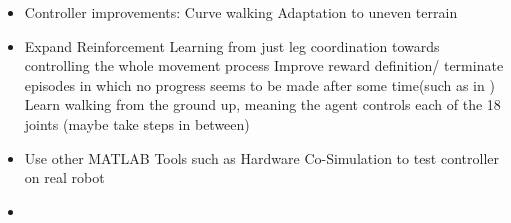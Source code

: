 \begin{itemize}
	
	\item Controller improvements:
		\subitem Curve walking
		\subitem Adaptation to uneven terrain
		\subitem 
	
	\item Expand Reinforcement Learning from just leg coordination towards controlling the whole movement process
		\subitem Improve reward definition/ terminate episodes in which no progress seems to be made after some time(such as in \cite{lillicrap2015continuous})
		\subitem Learn walking from the ground up, meaning the agent controls each of the 18 joints (maybe take steps in between)
		\subitem
	
	\item Use other MATLAB Tools such as Hardware Co-Simulation to test controller on real robot
	
	\item 
	
\end{itemize}